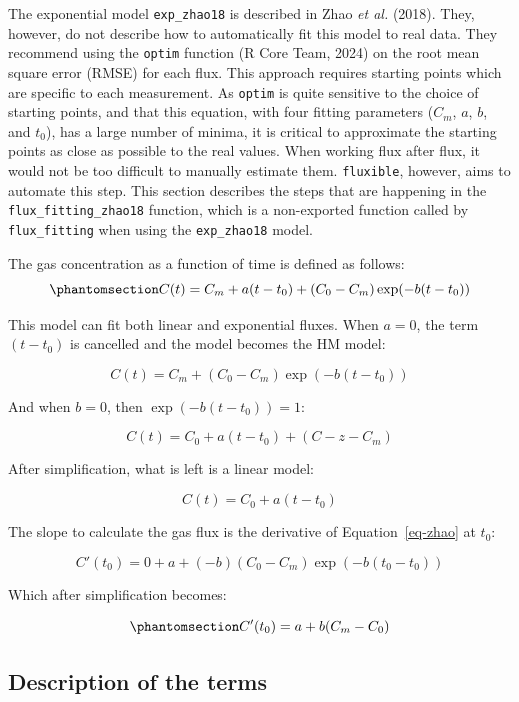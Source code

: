 \documentclass[
  letterpaper,
  DIV=11,
  numbers=noendperiod]{scrartcl}
\begin{document}
The exponential model \texttt{exp\_zhao18} is described in Zhao \emph{et
al.} (2018). They, however, do not describe how to automatically fit
this model to real data. They recommend using the \texttt{optim}
function (R Core Team, 2024) on the root mean square error (RMSE) for
each flux. This approach requires starting points which are specific to
each measurement. As \texttt{optim} is quite sensitive to the choice of
starting points, and that this equation, with four fitting parameters
(\(C_m\), \(a\), \(b\), and \(t_0\)), has a large number of minima, it
is critical to approximate the starting points as close as possible to
the real values. When working flux after flux, it would not be too
difficult to manually estimate them. \texttt{fluxible}, however, aims to
automate this step. This section describes the steps that are happening
in the \texttt{flux\_fitting\_zhao18} function, which is a non-exported
function called by \texttt{flux\_fitting} when using the
\texttt{exp\_zhao18} model.

The gas concentration as a function of time is defined as follows:
\begin{equation}\phantomsection\label{eq-zhao}{
C(t) = C_m + a(t - t_0) + (C_0 - C_m) \exp( - b(t - t_0))
}\end{equation}

This model can fit both linear and exponential fluxes. When \(a = 0\),
the term \((t - t_0)\) is cancelled and the model becomes the HM model:

\[
C(t) = C_m + (C_0 - C_m)\exp(-b(t-t_0))
\]

And when \(b=0\), then \(\exp(-b(t-t_0)) = 1\):

\[
C(t) = C_0 + a (t - t_0) + (C-z - C_m)
\]

After simplification, what is left is a linear model:

\[
C(t)=C_0 + a(t - t_0)
\]

The slope to calculate the gas flux is the derivative of
Equation~\ref{eq-zhao} at \(t_0\):

\[
C'(t_0)=0 + a + (-b) (C_0 - C_m) \exp( - b(t_0 - t_0))
\]

Which after simplification becomes:

\begin{equation}\phantomsection\label{eq-slope}{
C'(t_0)=a + b (C_m - C_0)
}\end{equation}

\subsection{Description of the terms}\label{description-of-the-terms}
\end{document}
